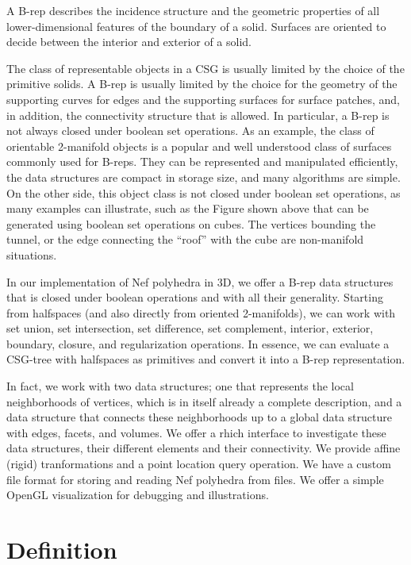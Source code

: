 A B-rep describes the incidence structure and the geometric properties
of all lower-dimensional features of the boundary of a solid. Surfaces
are oriented to decide between the interior and exterior of a solid.

The class of representable objects in a CSG is usually limited by the
choice of the primitive solids. A B-rep is usually limited by the
choice for the geometry of the supporting curves for edges and the
supporting surfaces for surface patches, and, in addition, the
connectivity structure that is allowed. In particular, a B-rep is not
always closed under boolean set operations.  As an example, the class
of orientable 2-manifold objects is a popular and well understood
class of surfaces commonly used for B-reps. They can be represented
and manipulated efficiently, the data structures are compact in
storage size, and many algorithms are simple. On the other side, this
object class is not closed under boolean set operations, as many
examples can illustrate, such as the Figure shown above that can be
generated using boolean set operations on cubes. The vertices bounding
the tunnel, or the edge connecting the ``roof'' with the cube are
non-manifold situations.

In our implementation of Nef polyhedra in 3D, we offer a B-rep data
structures that is closed under boolean operations and with all their
generality. Starting from halfspaces (and also directly from oriented
2-manifolds), we can work with set union, set intersection, set
difference, set complement, interior, exterior, boundary, closure, and
regularization operations. In essence, we can evaluate a CSG-tree with
halfspaces as primitives and convert it into a B-rep representation.

In fact, we work with two data structures; one that represents the
local neighborhoods of vertices, which is in itself already a complete
description, and a data structure that connects these neighborhoods up
to a global data structure with edges, facets, and volumes. We offer a
rhich interface to investigate these data structures, their different
elements and their connectivity. We provide affine (rigid)
tranformations and a point location query operation. We have a custom
file format for storing and reading Nef polyhedra from files. We offer
a simple OpenGL visualization for debugging and illustrations.


\section{Definition}

